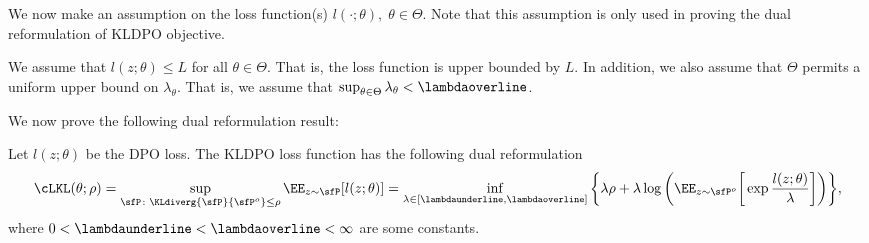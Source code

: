 We now make an assumption on the loss function(s) $l(\cdot;\theta),\;\theta\in\Theta$. Note that this assumption is only used in proving the dual reformulation of KLDPO objective.
\begin{assumption}\label{assum:kldpo-assumptions}
    We assume that $l(z;\theta)\leq L$ for all $\theta\in\Theta$. That is, the loss function is upper bounded by $L$. In addition, we also assume that $\Theta$ permits a uniform upper bound on $\lambda_\theta$. That is, we assume that $\sup_{\theta\in\Theta} \lambda_\theta < \lambdaoverline$.
\end{assumption}

We now prove the following dual reformulation result:
\begin{lemma}\label{lem:kldpo-dual-reformulation-complete}
    Let $l(z;\theta)$ be the DPO loss. The KLDPO loss function has the following dual reformulation
    \begin{equation*}
        \cLKL(\theta;\rho) = \sup_{\sfP\colon \KLdiverg{\sfP}{\sfP^o}\leq \rho} \EE_{z\sim\sfP} [l(z;\theta)]= \inf_{\lambda\in[\lambdaunderline,\lambdaoverline]}\bigg\{\lambda\rho + \lambda\log\bigg(\EE_{z\sim\sfP^o}\bigg[ \exp{\frac{l(z;\theta)}{\lambda}}\bigg]\bigg)\bigg\},
    \end{equation*}
    where $0<\lambdaunderline<\lambdaoverline<\infty$ are some constants.
\end{lemma}
